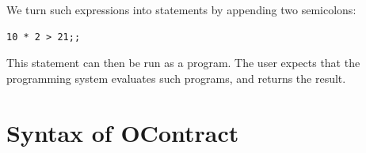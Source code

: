 \documentclass[a4paper]{article}
\begin{document}
We turn such expressions into statements by appending two semicolons:

\begin{verbatim}
10 * 2 > 21;;
\end{verbatim}

This statement can then be run as a program.
The user expects that the programming system evaluates such programs, and returns the result.


\section{Syntax of OContract}
\end{document}
